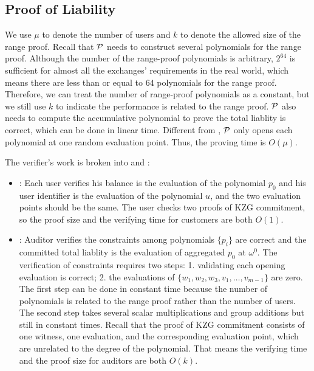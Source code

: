 \subsection{Proof of Liability}
We use $\mu$ to denote the number of users and $k$ to denote the allowed size of the range proof. Recall that $\mathcal{P}$ needs to construct several polynomials for the range proof. Although the number of the range-proof polynomials is arbitrary, $2^{64}$ is sufficient for almost all the exchanges' requirements in the real world, which means there are less than or equal to 64 polynomials for the range proof. Therefore, we can treat the number of range-proof polynomials as a constant, but we still use $k$ to indicate the performance is related to the range proof. $\mathcal{P}$ also needs to compute the accumulative polynomial to prove the total liablity is correct, which can be done in linear time. Different from \bootstrap, $\mathcal{P}$ only opens each polynomial at one random evaluation point. Thus, the proving time is $O(\mu)$.

The verifier's work is broken into \userproof and \pol:
\begin{itemize}

\item \userproof: Each user verifies his balance is the evaluation of the polynomial $p_0$ and his user identifier is the evaluation of the polynomial $u$, and the two evaluation points should be the same. The user checks two proofs of KZG commitment, so the proof size and the verifying time for customers are both $O(1)$.

\item \pol: Auditor verifies the constraints among polynomials $\{p_i\}$ are correct and the committed total liablity is the evaluation of aggregated $p_0$ at $\omega^0$. The verification of constraints requires two steps: 1. validating each opening evaluation is correct; 2. the evaluations of $\{w_1,w_2,w_3,v_1,\dots,v_{m-1}\}$ are zero. The first step can be done in constant time because the number of polynomials is related to the range proof rather than the number of users. The second step takes several scalar multiplications and group additions but still in constant times. Recall that the proof of KZG commitment consists of one witness, one evaluation, and the corresponding evaluation point, which are unrelated to the degree of the polynomial. That means the verifying time and the proof size for auditors are both $O(k)$.

\end{itemize}


